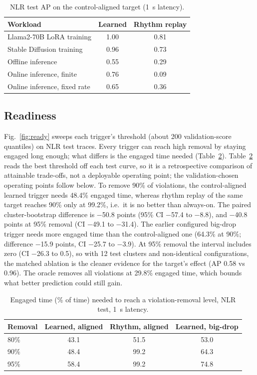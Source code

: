 \documentclass[conference]{IEEEtran}
\begin{document}
\begin{table}[t]
\centering
\caption{NLR test AP on the control-aligned target (1~s latency).}
\label{tab:wl}
\begin{tabular}{lcc}
\toprule
Workload & Learned & Rhythm replay\\
\midrule
Llama2-70B LoRA training & 1.00 & 0.81\\
Stable Diffusion training & 0.96 & 0.73\\
Offline inference & 0.55 & 0.29\\
Online inference, finite & 0.76 & 0.09\\
Online inference, fixed rate & 0.65 & 0.36\\
\bottomrule
\end{tabular}
\end{table}

\subsection{Readiness}
Fig.~\ref{fig:ready} sweeps each trigger's threshold (about 200 validation-score quantiles) on NLR test
traces. Every trigger can reach high removal by staying engaged long enough; what differs is the engaged
time needed (Table~\ref{tab:arm}). Table~\ref{tab:arm} reads the best threshold off each test curve, so
it is a retrospective comparison of attainable trade-offs, not a deployable operating point; the
validation-chosen operating points follow below.
To remove 90\% of violations, the control-aligned learned trigger needs 48.4\%
engaged time, whereas rhythm replay of the same target reaches 90\% only at 99.2\%,
i.e.\ it is no better than always-on. The paired cluster-bootstrap difference is
$-$50.8 points (95\% CI $-$57.4 to
$-$8.8), and $-$40.8 points at 95\% removal (CI
$-$49.1 to $-$31.4). The earlier configured big-drop trigger
needs more engaged time than the control-aligned one (64.3\% at 90\%; difference
$-$15.9 points, CI $-$25.7 to $-$3.9). At 95\%
removal the interval includes zero (CI $-$26.3 to 0.5), so with
12 test clusters and non-identical configurations, the matched ablation is the cleaner evidence for the
target's effect (AP 0.58 vs 0.96). The oracle removes all violations at 29.8\% engaged time, which bounds what
better prediction could still gain.

\begin{table}[t]
\centering
\caption{Engaged time (\% of time) needed to reach a violation-removal level, NLR test, 1~s latency.}
\label{tab:arm}
\begin{tabular}{lccc}
\toprule
Removal & Learned, aligned & Rhythm, aligned & Learned, big-drop\\
\midrule
80\% & 43.1 & 51.5 & 53.0\\
90\% & 48.4 & 99.2 & 64.3\\
95\% & 58.4 & 99.2 & 74.8\\
\bottomrule
\end{tabular}
\end{table}
\end{document}
